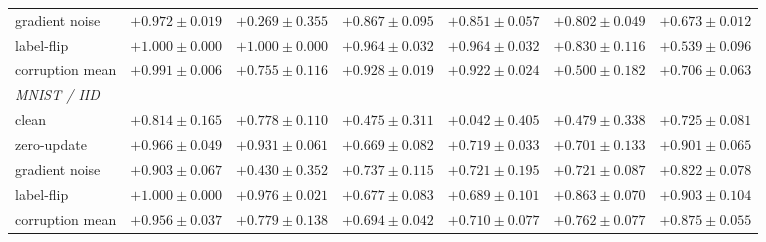 \documentclass[letterpaper]{article} %
\theoremstyle{plain}
\begin{document}
\begin{table}[t]
\begin{tabular}{lcccccc}
gradient noise & $+0.972\pm0.019$ & $+0.269\pm0.355$ & $+0.867\pm0.095$ & $+0.851\pm0.057$ & $+0.802\pm0.049$ & $+0.673\pm0.012$ \\
label-flip & $+1.000\pm0.000$ & $+1.000\pm0.000$ & $+0.964\pm0.032$ & $+0.964\pm0.032$ & $+0.830\pm0.116$ & $+0.539\pm0.096$ \\
corruption mean & $+0.991\pm0.006$ & $+0.755\pm0.116$ & $+0.928\pm0.019$ & $+0.922\pm0.024$ & $+0.500\pm0.182$ & $+0.706\pm0.063$ \\
\hline
\multicolumn{7}{l}{\emph{MNIST / IID}} \\
clean & $+0.814\pm0.165$ & $+0.778\pm0.110$ & $+0.475\pm0.311$ & $+0.042\pm0.405$ & $+0.479\pm0.338$ & $+0.725\pm0.081$ \\
zero-update & $+0.966\pm0.049$ & $+0.931\pm0.061$ & $+0.669\pm0.082$ & $+0.719\pm0.033$ & $+0.701\pm0.133$ & $+0.901\pm0.065$ \\
gradient noise & $+0.903\pm0.067$ & $+0.430\pm0.352$ & $+0.737\pm0.115$ & $+0.721\pm0.195$ & $+0.721\pm0.087$ & $+0.822\pm0.078$ \\
label-flip & $+1.000\pm0.000$ & $+0.976\pm0.021$ & $+0.677\pm0.083$ & $+0.689\pm0.101$ & $+0.863\pm0.070$ & $+0.903\pm0.104$ \\
corruption mean & $+0.956\pm0.037$ & $+0.779\pm0.138$ & $+0.694\pm0.042$ & $+0.710\pm0.077$ & $+0.762\pm0.077$ & $+0.875\pm0.055$ \\
\hline
\end{tabular}
\end{table}
\end{document}
